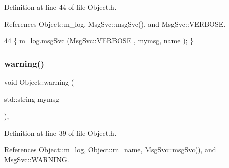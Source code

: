 Definition at line 44 of file Object.\+h.



References Object\+::m\+\_\+log, Msg\+Svc\+::msg\+Svc(), and Msg\+Svc\+::\+V\+E\+R\+B\+O\+SE.


\begin{DoxyCode}
44 \{ \hyperlink{classObject_a0d269813dd7ac1f24bc143031e2963f2}{m\_log}.\hyperlink{classMsgSvc_ad25f18047920cc59a314e5098259711c}{msgSvc} (\hyperlink{classMsgSvc_ae671eb7301996cd049d2da8a65925926af655256b06494ade5ba830abe5401ec9}{MsgSvc::VERBOSE} , mymsg, \hyperlink{classObject_a300f4c05dd468c7bb8b3c968868443c1}{name} ); \}
\end{DoxyCode}
\mbox{\label{classObject_a65cd4fda577711660821fd2cd5a3b4c9}} 
\subsubsection{\texorpdfstring{warning()}{warning()}\hspace{0.1cm}{\footnotesize\ttfamily [1/2]}}
{\footnotesize\ttfamily void Object\+::warning (\begin{DoxyParamCaption}\item[{std\+::string}]{mymsg }\end{DoxyParamCaption})\hspace{0.3cm}{\ttfamily [inline]}, {\ttfamily [inherited]}}



Definition at line 39 of file Object.\+h.



References Object\+::m\+\_\+log, Object\+::m\+\_\+name, Msg\+Svc\+::msg\+Svc(), and Msg\+Svc\+::\+W\+A\+R\+N\+I\+NG.



